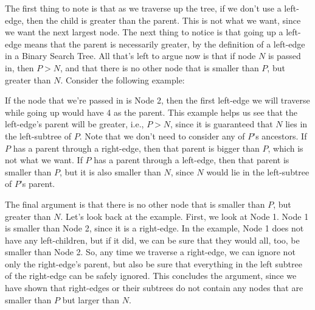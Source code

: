 \begin{solution}[2.5in]
The first thing to note is that as we traverse up the tree, if we don't use a
left-edge, then the child is greater than the parent. This is not what we want,
since we want the next largest node. The next thing to notice is that going up
a left-edge means that the parent is necessarily greater, by the definition of
a left-edge in a Binary Search Tree. All that's left to argue now is that if
node $N$ is passed in, then $P>N$, and that there is no other node that is
smaller than $P$, but greater than $N$. Consider the following example:

\begin{center}
\end{center}

If the node that we're passed in is Node 2, then the first left-edge we will
traverse while going up would have 4 as the parent. This example helps us see
that the left-edge's parent will be greater, i.e., $P>N$, since it is
guaranteed that $N$ lies in the left-subtree of $P$. Note that we don't need to
consider any of $P$'s ancestors. If $P$ has a parent through a right-edge, then
that parent is bigger than $P$, which is not what we want. If $P$ has a parent
through a left-edge, then that parent is smaller than $P$, but it is also
smaller than $N$, since $N$ would lie in the left-subtree of $P$'s parent.

The final argument is that there is no other node that is smaller than $P$, but
greater than $N$. Let's look back at the example. First, we look at Node 1.
Node 1 is smaller than Node 2, since it is a right-edge. In the example, Node 1
does not have any left-children, but if it did, we can be sure that they would
all, too, be smaller than Node 2. So, any time we traverse a right-edge, we can
ignore not only the right-edge's parent, but also be sure that everything in
the left subtree of the right-edge can be safely ignored. This concludes the
argument, since we have shown that right-edges or their subtrees do not contain
any nodes that are smaller than $P$ but larger than $N$.
\end{solution}
